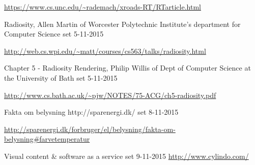 \begin{thebibliography}{99}
  \url{https://www.cs.unc.edu/~rademach/xroads-RT/RTarticle.html}

  Radiosity,
  Allen Martin of Worcester Polytechnic Institute's department for Computer Science
  set 5-11-2015

  \url{http://web.cs.wpi.edu/~matt/courses/cs563/talks/radiosity.html}

  Chapter 5 - Radiosity Rendering,
  Philip Willis of Dept of Computer Science at the University of Bath
  set 5-11-2015

  \url{http://www.cs.bath.ac.uk/~pjw/NOTES/75-ACG/ch5-radiosity.pdf}
  
  Fakta om belysning
  http://sparenergi.dk/
  set 8-11-2015
  
  \url{http://sparenergi.dk/forbruger/el/belysning/fakta-om-belysning#farvetemperatur}

  Visual content & software as a service
  set 9-11-2015
  \url{http://www.cylindo.com/}

\end{thebibliography}
\clearpage